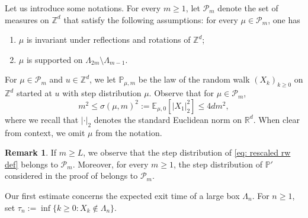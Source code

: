 \documentclass[11pt,a4paper]{article}
\numberwithin{equation}{section}
\theoremstyle{plain}
\theoremstyle{definition}
\newtheorem{Rem}[Thm]{Remark}
\newcommand\bfc{\mathbf{c}}
\begin{document}
Let us introduce some notations. For every $m\geq 1$, let $\mathcal P_m$ denote the set of measures on $\mathbb Z^d$ that satisfy the following assumptions: for every $\mu \in \mathcal P_m$, one has
\begin{enumerate}
	\item[$(i)$] $\mu$ is invariant under reflections and rotations of $\mathbb Z^d$;
	\item[$(ii)$] $\mu$ is supported on $\Lambda_{2m}\setminus \Lambda_{m-1}$.
\end{enumerate}
For $\mu \in \mathcal P_m$ and $u \in \mathbb Z^d$, we let $\mathbb P_{\mu,m}$ be the law of the random walk $(X_k)_{k\geq 0}$ on $\mathbb Z^d$  started at $u$ with step distribution $\mu$. Observe that for $\mu \in \mathcal P_m$,
\begin{equation}\label{eq: estimate sigma}
	m^2\leq \sigma(\mu,m)^2:=\mathbb E_{\mu,0}[|X_1|_2^2]\leq 4dm^2,
\end{equation}
where we recall that $| \cdot |_2$ denotes the standard Euclidean norm on $\mathbb R^d$. When clear from context, we omit $\mu$ from the notation.
\begin{Rem} If $m\geq L$, we observe that the step distribution of \eqref{eq: rescaled rw def} belongs to $\mathcal P_m$. Moreover, for every $m\geq 1$, the step distribution of $\mathbb P'$ considered in the proof of \cite[Proposition~3.2]{DumPan24WSAW} belongs to $\mathcal P_m$.
\end{Rem}
%
Our first estimate concerns the expected exit time of a large box $\Lambda_n$. For $n\geq 1$, set $\tau_n:=\inf\{k\geq 0: X_k\notin \Lambda_n\}$.
\end{document}
